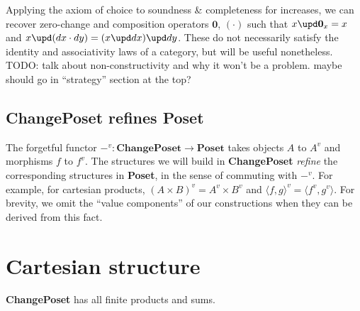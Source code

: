 \documentclass[]{rntz}
\newcommand\todo[1]{{\color{Rhodamine}#1}}
\newcommand\cat\textbf
\newcommand\CP{\cat{ChangePoset}}
\newcommand\Poset{\cat{Poset}}
\newcommand\x\times
\newcommand\zero{\ensuremath{\mathbold{0}}}
\newcommand\vals[1]{#1^v} %
\newcommand\valfn{\ensuremath{\vals{-}}}
\newcommand\fork[1]{\langle{#1}\rangle}
\newcommand\funct[1]{\vals{#1}}
\begin{document}
Applying the axiom of choice to soundness \& completeness for increases, we can
recover zero-change and composition operators $\zero$, $(\cdot)$ such that $x
\upd \zero_x = x$ and $x \upd (dx \cdot dy) = (x \upd dx) \upd dy$. These do not
necessarily satisfy the identity and associativity laws of a category, but will
be useful nonetheless. \todo{TODO: talk about non-constructivity and why it
  won't be a problem. maybe should go in ``strategy'' section at the top?}


\subsection{\CP{} refines \Poset{}}
\label{sec:refines}

The forgetful functor $\valfn : \CP \to \Poset$ takes objects $A$ to $\vals{A}$
and morphisms $f$ to $\funct f$. The structures we will build in \CP{}
\emph{refine} the corresponding structures in \Poset{}, in the sense of
commuting with $\valfn$. For example, for cartesian products, $\vals{(A \x B)} =
\vals{A} \x \vals{B}$ and $\funct{\fork{f,g}} = \fork{\funct f, \funct g}$. For
brevity, we omit the ``value components'' of our constructions when they can be
derived from this fact.


\section{Cartesian structure}

\begin{theorem}
  \CP{} has all finite products and sums.
\end{theorem}
\end{document}
